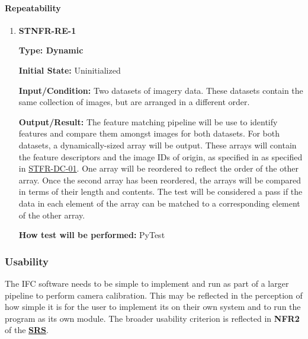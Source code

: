 \documentclass[12pt, titlepage]{article}
\begin{document}
\paragraph{Repeatability}
\begin{enumerate}
\item \hypertarget{STNFR-RE-1}{\textbf{STNFR-RE-1}\\}
\textbf{Type: Dynamic}

\textbf{Initial State:} Uninitialized

\textbf{Input/Condition:} Two datasets of imagery data. These datasets contain the same collection of images, 
but are arranged in a different order.

\textbf{Output/Result:} The feature matching pipeline will be use to identify features and compare them amongst 
images for both datasets. For both datasets, a dynamically-sized array will be output. These arrays will 
contain the feature descriptors and the image IDs of origin, as specified in as specified in 
\hyperlink{STFR-DC-01}{STFR-DC-01}. 
One array will be reordered to reflect the order of the other array. Once the second array has been reordered, 
the arrays will be compared in terms of their length and contents. The test will be considered a pass if the 
data in each element of the array can be matched to a corresponding element of the other array. 

\textbf{How test will be performed:} PyTest
\end{enumerate}

\subsubsection{Usability}
The IFC software needs to be simple to implement and run as part of a larger pipeline to 
perform camera calibration. This may be reflected in the perception of how simple it is for the user to 
implement its on their own system and to run the program as its own module. The broader usability criterion is 
reflected in \textbf{NFR2} of the 
\textbf{\href{https://github.com/KiranSingh15/CAS-741-Image-Correspondences/blob/main/docs/SRS/SRS.pdf}
{SRS}}. \\
\end{document}
